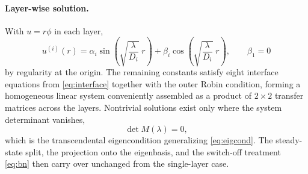 \documentclass[11pt,a4paper]{article}
\begin{document}
\paragraph{Layer-wise solution.}
With $u = r\phi$ in each layer,
\begin{equation}
u^{(i)}(r) = \alpha_{i}\sin\!\left(\sqrt{\frac{\lambda}{D_{i}}}\;r\right)
+ \beta_{i}\cos\!\left(\sqrt{\frac{\lambda}{D_{i}}}\;r\right) ,
\qquad
\beta_{1} = 0
\end{equation}
by regularity at the origin. The remaining constants satisfy eight interface
equations from \eqref{eq:interface} together with the outer Robin condition, forming
a homogeneous linear system conveniently assembled as a product of $2 \times 2$
transfer matrices across the layers. Nontrivial solutions exist only where the
system determinant vanishes,
\begin{equation}
\det M(\lambda) = 0 ,
\end{equation}
which is the transcendental eigencondition generalizing \eqref{eq:eigcond}. The
steady-state split, the projection onto the eigenbasis, and the switch-off treatment
\eqref{eq:bn} then carry over unchanged from the single-layer case.
\end{document}
